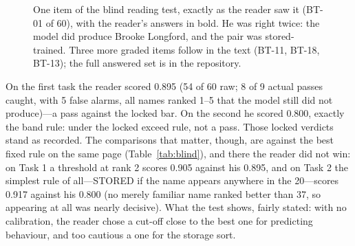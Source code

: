 \documentclass[11pt]{article}
\begin{document}
\begin{figure}[h]
\centering
{}
\caption{One item of the blind reading test, exactly as the reader
saw it (BT-01 of 60), with the reader's answers in bold. He was
right twice: the model did produce Brooke Longford, and the pair
was stored-trained. Three more graded items follow in the text
(BT-11, BT-18, BT-13); the full answered set is in the repository.}
\label{fig:blinditem}
\end{figure}

On the first task the reader scored 0.895 (54 of 60 raw; 8 of 9 actual passes caught, with 5 false alarms, all names ranked 1--5 that the model still did not produce)---a pass against the locked bar. On the second he scored 0.800, exactly the band rule: under the locked exceed rule, not a pass. Those locked verdicts stand as recorded. The comparisons that matter, though, are against the best fixed rule on the same page (Table~\ref{tab:blind}), and there the reader did not win: on Task 1 a threshold at rank 2 scores 0.905 against his 0.895, and on Task 2 the simplest rule of all---STORED if the name appears anywhere in the 20---scores 0.917 against his 0.800 (no merely familiar name ranked better than 37, so appearing at all was nearly decisive). What the test shows, fairly stated: with no calibration, the reader chose a cut-off close to the best one for predicting behaviour, and too cautious a one for the storage sort.
\end{document}
